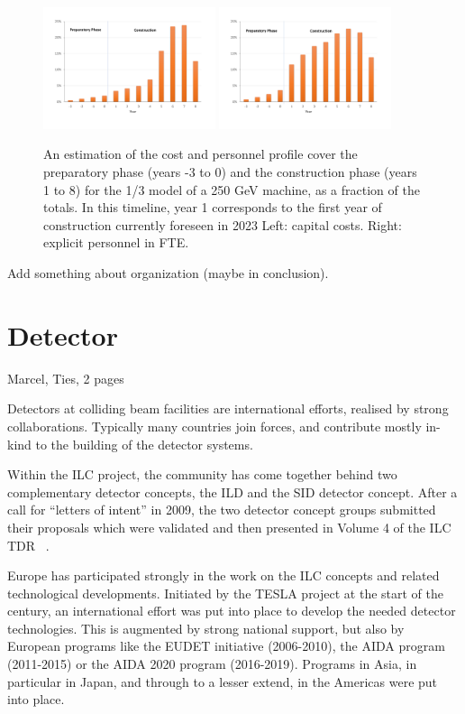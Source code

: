 \documentclass[%
 reprint,
 amsmath,amssymb,
 aps,
]{revtex4-1}
\begin{document}
\begin{figure}[htbp]
\includegraphics[width=0.45\textwidth]{figures/profile-250GeV-MEUR-norm.pdf}
\includegraphics[width=0.45\textwidth]{figures/profile-250GeV-FTE-norm.pdf}
\caption{\label{fig:costprofile:costprofile} An estimation of the cost and personnel profile cover the preparatory phase (years -3 to 0) 
and the construction phase (years 1 to 8) for the 1/3 model of a 250 GeV machine, as a fraction of the
totals. In this timeline, 
year 1 corresponds to the first year of construction currently foreseen in 2023 
Left: capital costs. Right: explicit personnel in FTE.
}
\end{figure}

Add something about organization (maybe in conclusion).

\section{\label{sec:det}Detector}
Marcel, Ties, 2 pages

Detectors at colliding beam facilities are international efforts, realised by strong collaborations. Typically many countries join forces, and contribute mostly in-kind to the building of the detector systems. 

Within the ILC project, the community has come together behind two complementary detector concepts, the ILD and the SID detector concept. After a call for ``letters of intent'' in 2009, the two detector concept groups submitted their proposals which were validated and then presented in Volume 4 of the ILC TDR ~\cite{ILC-TDR}.

Europe has participated strongly in the work on the ILC concepts and related technological developments. Initiated by the TESLA project at the start of the century, an international effort was put into place to develop the needed detector technologies. This is augmented by strong national support, but also by European programs like the EUDET initiative (2006-2010), the AIDA program (2011-2015) or the AIDA 2020 program (2016-2019). Programs in Asia, in particular in Japan, and through to a lesser extend, in the Americas were put into place. 
\end{document}
